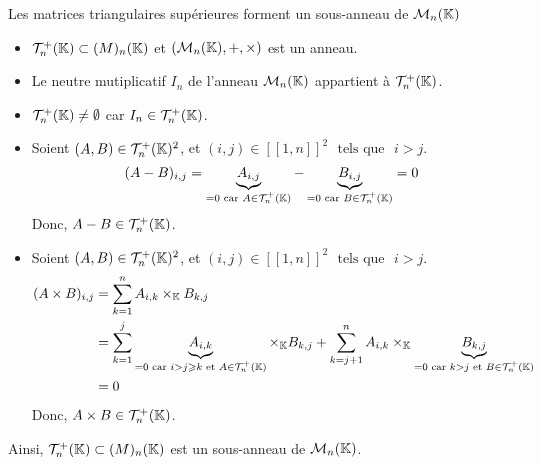 \documentclass{article}
\renewenvironment{question_kholle}[2][ ]
{
	\subsection{\texorpdfstring{#2}{}}
	\notblank{#1}
	{
		\noindent #1
		\bigbreak
	}
	{}
	\begin{proof}
}
{
	\end{proof}
}
\begin{document}
\begin{question_kholle}
	{Les matrices triangulaires supérieures forment un sous-anneau de $\mathcal{M}_n(\mathbb K)$}
	\hfill \\
	\begin{itemize}[label=$\star$]
		\item $\mathcal{T}_n^+(\mathbb K) \subset \mathcal(M)_n(\mathbb K)$ et $(\mathcal{M}_n(\mathbb K), +, \times)$ est un anneau.
		\item Le neutre mutiplicatif $I_{n}$ de l’anneau $\mathcal{M}_n(\mathbb K)$ appartient à $\mathcal{T}_n^+(\mathbb K)$.
		\item $\mathcal{T}_n^+(\mathbb K) \neq \emptyset$ car $I_n \in \mathcal{T}_n^+(\mathbb K)$.
		\item Soient $(A, B) \in \mathcal{T}_n^+(\mathbb K)^2$, et $(i, j) \in [\![1,n]\!]^2$ $\text{ tels que }$ $i > j$.
		      \begin{equation*}
			      (A - B)_{i,j}
			      = \underbrace{A_{i,j}}_{=0 \text{ car } A \in \mathcal{T}_n^+(\mathbb K)} - \underbrace{B_{i,j}}_{=0 \text{ car } B \in \mathcal{T}_n^+(\mathbb K)}
			      = 0
		      \end{equation*}
		      Donc, $A - B \in \mathcal{T}_n^+(\mathbb K)$.

		\item Soient $(A, B) \in \mathcal{T}_n^+(\mathbb K)^2$, et $(i, j) \in [\![1,n]\!]^2$ $\text{ tels que }$ $i > j$.
		      \begin{align*}
			      (A \times B)_{i,j}
			       & = \sum_{k=1}^{n} A_{i,k} \times_{\mathbb K} B_{k,j}                                                                                        \\
			       & = \sum_{k=1}^{j} \underbrace{A_{i,k}}_{=0 \text{ car } i > j \geqslant k \text{ et } A \in \mathcal{T}_n^+(\mathbb K)} \times_{\mathbb K} B_{k,j}
			      + \sum_{k=j+1}^{n} A_{i,k} \times_{\mathbb K} \underbrace{B_{k,j}}_{=0 \text{ car } k > j \text{ et } B \in \mathcal{T}_n^+(\mathbb K)}              \\
			       & = 0
		      \end{align*}
		      Donc, $A \times B \in \mathcal{T}_n^+(\mathbb K)$.
	\end{itemize}
	Ainsi, $\mathcal{T}_n^+(\mathbb K) \subset \mathcal(M)_n(\mathbb K)$ est un sous-anneau de $\mathcal{M}_n(\mathbb K)$.
\end{question_kholle}
\end{document}
